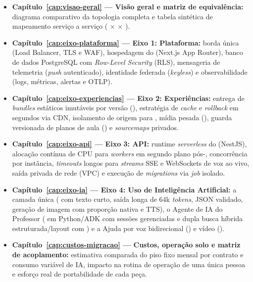 \begin{itemize}
  \item \textbf{Capítulo~\ref{cap:visao-geral} --- Visão geral e matriz de equivalência:}
    diagrama comparativo da topologia completa e tabela sintética de mapeamento
    serviço a serviço ( $\times$  $\times$ ).
  \item \textbf{Capítulo~\ref{cap:eixo-plataforma} --- Eixo 1: Plataforma:}
    borda única (Load Balancer, TLS e WAF), hospedagem do 
    (Next.js App Router), banco de dados PostgreSQL com \emph{Row-Level Security}
    (RLS), mensageria de telemetria (\emph{push} autenticado), identidade
    federada (\emph{keyless}) e observabilidade (logs, métricas, alertas e OTLP).
  \item \textbf{Capítulo~\ref{cap:eixo-experiencias} --- Eixo 2: Experiências:}
    entrega de \emph{bundles} estáticos imutáveis por versão (),
    estratégia de \emph{cache} e \emph{rollback} em segundos via CDN, isolamento
    de origem para , mídia pesada (), guarda
    versionada de planos de aula () e \emph{sourcemaps} privados.
  \item \textbf{Capítulo~\ref{cap:eixo-api} --- Eixo 3: API:}
    runtime \emph{serverless} do  (NestJS), alocação contínua de
    CPU para \emph{workers} em segundo plano pós-, concorrência por
    instância, \emph{timeouts} longos para \emph{streams} SSE e WebSockets de
    voz ao vivo, saída privada de rede (VPC) e execução de \emph{migrations} via
    \emph{job} isolado.
  \item \textbf{Capítulo~\ref{cap:eixo-ia} --- Eixo 4: Uso de Inteligência Artificial:}
    a camada única ( com texto curto, saída longa de 64k
    \emph{tokens}, JSON validado, geração de imagem com proporção nativa e TTS),
    o Agente de IA do Professor ( em Python/ADK com
    sessões gerenciadas e dupla busca híbrida estruturada/layout com
    ) e a Ajuda por voz bidirecional () e vídeo
    ().
  \item \textbf{Capítulo~\ref{cap:custos-migracao} --- Custos, operação solo e matriz de acoplamento:}
    estimativa comparada do piso fixo mensal por contrato e consumo variável de
    IA, impacto na rotina de operação de uma única pessoa e esforço real de
    portabilidade de cada peça.
\end{itemize}

